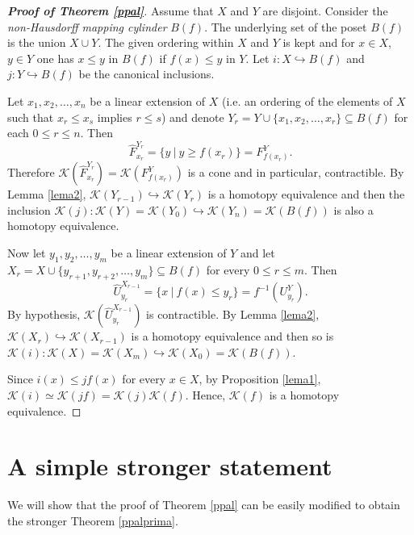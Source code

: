 \documentclass[11pt,twoside]{amsart}
\theoremstyle{plain}
\theoremstyle{remark}
\theoremstyle{definition}
\newcommand{\kp}{\mathcal{K}}
\begin{document}
\begin{proof}[\textbf{Proof of Theorem \ref{ppal}}]
Assume that $X$ and $Y$ are disjoint. Consider the \textit{non-Hausdorff mapping cylinder} $B(f)$. The underlying set of the poset $B(f)$ is the union $X\cup Y$. The given ordering within $X$ and $Y$ is kept and for $x\in X$, $y\in Y$ one has $x\le y$ in $B(f)$ if $f(x)\le y$ in $Y$. Let $i:X\hookrightarrow B(f)$ and $j:Y\hookrightarrow B(f)$ be the canonical inclusions.

Let $x_1, x_2, \ldots, x_n$ be a linear extension of $X$ (i.e. an ordering of the elements of $X$ such that $x_r\le x_s$ implies $r\le s$) and denote $Y_r=Y\cup \{x_1, x_2, \ldots, x_r\} \subseteq B(f)$ for each $0\le r\le n$. Then $$\hat{F}_{x_r}^{Y_r}=\{y \ | \ y \ge f(x_r)\}=F_{f(x_r)}^Y.$$
Therefore $\kp (\hat{F}_{x_r}^{Y_r})=\kp (F_{f(x_r)}^Y)$ is a cone and in particular, contractible. By Lemma \ref{lema2}, $\kp (Y_{r-1}) \hookrightarrow \kp (Y_{r})$ is a homotopy equivalence and then the inclusion $\kp(j): \kp (Y)=\kp (Y_0) \hookrightarrow \kp (Y_n)=\kp (B(f))$ is also a homotopy equivalence.

Now let $y_1,y_2, \ldots, y_m$ be a linear extension of $Y$ and let $X_r=X \cup \{y_{r+1},y_{r+2}, \ldots, y_m\} \subseteq B(f)$ for every $0\le r\le m$. Then $$\hat{U}_{y_{r}}^{X_{r-1}}=\{x \ | \ f(x)\le y_{r}\}=f^{-1}(U_{y_r}^Y).$$ By hypothesis, $\kp (\hat{U}_{y_{r}}^{X_{r-1}})$ is contractible. By Lemma \ref{lema2}, $\kp (X_r) \hookrightarrow \kp (X_{r-1})$ is a homotopy equivalence and then so is $\kp (i): \kp (X)=\kp (X_m) \hookrightarrow \kp (X_0)=\kp (B(f))$.

Since $i(x)\le jf(x)$ for every $x\in X$, by Proposition \ref{lema1}, $\kp(i)\simeq \kp(jf)=\kp (j) \kp (f)$. Hence, $\kp (f)$ is a homotopy equivalence. 
\end{proof}

\section{A simple stronger statement} \label{seccionppal}


We will show that the proof of Theorem \ref{ppal} can be easily modified to obtain the stronger Theorem \ref{ppalprima}.
\end{document}
